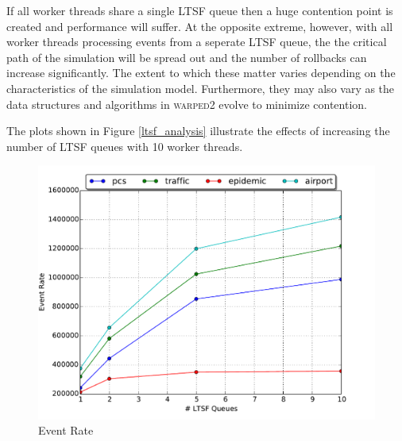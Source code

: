 \documentclass[11pt]{book}
\begin{document}
If all worker threads share a single LTSF queue then a huge contention point is created and
performance will suffer.  At the opposite extreme, however, with all worker threads processing
events from a seperate LTSF queue, the the critical path of the simulation will be spread out
and the number of rollbacks can increase significantly.  The extent to which these matter varies
depending on the characteristics of the simulation model.  Furthermore, they may also vary as
the data structures and algorithms in \textsc{warped2} evolve to minimize contention.

The plots shown in Figure \ref{ltsf_analysis} illustrate the effects of increasing the number
of LTSF queues with 10 worker threads.

\begin{figure}
  \begin{minipage}{.5\textwidth}
    \begin{center}
      \includegraphics[width=\textwidth,keepaspectratio,quiet]{figs/pending_event_set/ltsf_event_rate.pdf} \\
      Event Rate \\
    \end{center}
  \end{minipage}%
  \hfill
  \begin{minipage}{.5\textwidth}
    \begin{center}

\end{center}
\end{minipage}
\end{figure}
\end{document}
